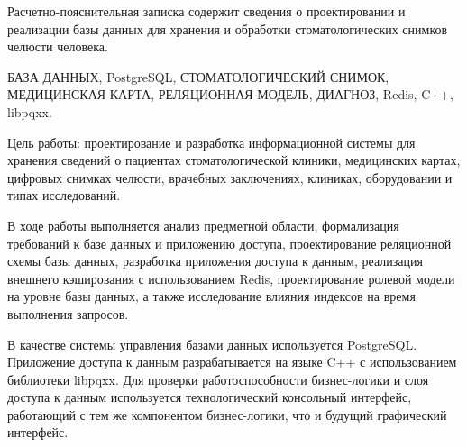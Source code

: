 
Расчетно-пояснительная записка содержит сведения о проектировании и реализации базы данных для хранения и обработки стоматологических снимков челюсти человека.

БАЗА ДАННЫХ, PostgreSQL, СТОМАТОЛОГИЧЕСКИЙ СНИМОК, МЕДИЦИНСКАЯ КАРТА, РЕЛЯЦИОННАЯ МОДЕЛЬ, ДИАГНОЗ, Redis, C++, libpqxx.

Цель работы: проектирование и разработка информационной системы для хранения сведений о пациентах стоматологической клиники, медицинских картах, цифровых снимках челюсти, врачебных заключениях, клиниках, оборудовании и типах исследований.

В ходе работы выполняется анализ предметной области, формализация требований к базе данных и приложению доступа, проектирование реляционной схемы базы данных, разработка приложения доступа к данным, реализация внешнего кэширования с использованием Redis, проектирование ролевой модели на уровне базы данных, а также исследование влияния индексов на время выполнения запросов.

В качестве системы управления базами данных используется PostgreSQL. Приложение доступа к данным разрабатывается на языке C++ с использованием библиотеки libpqxx. Для проверки работоспособности бизнес-логики и слоя доступа к данным используется технологический консольный интерфейс, работающий с тем же компонентом бизнес-логики, что и будущий графический интерфейс.

\clearpage
